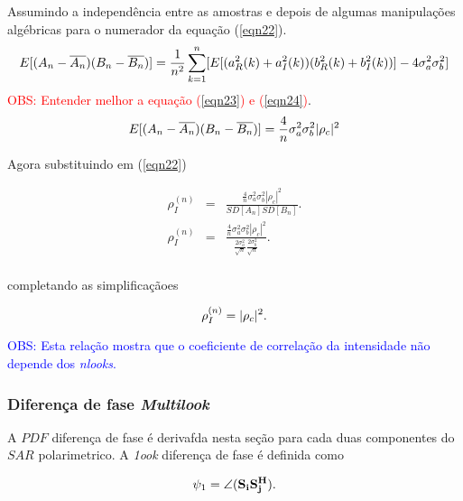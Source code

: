 Assumindo a independência entre as amostras e depois de algumas manipulações algébricas para o numerador da equação (\ref{eqn22}). 
\begin{equation}\label{eqn23}
	E[(A_n-\overline{A_n})(B_n-\overline{B_n})]=\frac{1}{n^2}\sum_{k=1}^{n}[E[(a_{R}^2(k)+a_{I}^2(k))(b_{R}^2(k)+b_{I}^2(k))]-4\sigma_a^2\sigma_b^2] \\
\end{equation}
\textcolor{red}{OBS: Entender melhor a equação (\ref{eqn23}) e (\ref{eqn24})}.
\begin{equation}\label{eqn24}
	E[(A_n-\overline{A_n})(B_n-\overline{B_n})]=\frac{4}{n}\sigma_a^2\sigma_b^2|\rho_c|^2\\
\end{equation}

Agora substituindo em (\ref{eqn22})

\begin{equation}\label{eqn25}
\begin{array}{ccc}
	\rho_I^{(n)}&=&\frac{\frac{4}{n}\sigma_a^2\sigma_b^2|\rho_c|^2}{SD[A_n]SD[B_n]}. \\
	\rho_I^{(n)}&=&\frac{\frac{4}{n}\sigma_a^2\sigma_b^2|\rho_c|^2}{\frac{2\sigma_a^2}{\sqrt{n}}\frac{2\sigma_b^2}{\sqrt{n}}}. \\
\end{array}
\end{equation}

completando as simplificaçãoes

\begin{equation}\label{eqn26}
	\rho_I^{(n)}=|\rho_c|^2. \\
\end{equation}

\textcolor{blue}{OBS: Esta relação mostra que o coeficiente de correlação da intensidade não depende dos {\it nlooks}.}

\subsubsection{Diferença de fase {\it Multilook}}

A $PDF$ diferença de fase é derivafda nesta seção para cada duas componentes do $SAR$ polarimetrico. A {\it 1ook} diferença de fase é definida como 


\begin{equation}\label{eqn27}
	\psi_1=\angle(\mathbf{S_iS_j^{H}}). \\
\end{equation}

